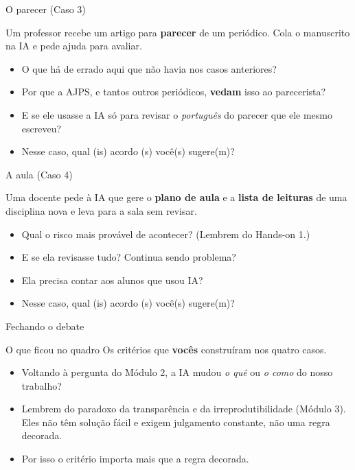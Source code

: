 \documentclass[11pt,aspectratio=169,t]{beamer}
\begin{document}
\begin{frame}{O parecer (Caso 3)}
  \begin{alertblock}{}
    \centering\large
    Um professor recebe um artigo para \textbf{parecer} de um periódico. Cola o manuscrito na IA e pede ajuda para avaliar.
  \end{alertblock}
  \vfill
  \begin{itemize}
    \item O que há de errado aqui que não havia nos casos anteriores?
    \item Por que a AJPS, e tantos outros periódicos, \textbf{vedam} isso ao parecerista?
    \item E se ele usasse a IA só para revisar o \textit{português} do parecer que ele mesmo escreveu?
         \item Nesse caso, qual (is) acordo (s) você(s) sugere(m)?
  \end{itemize}
\end{frame}
\begin{frame}{A aula (Caso 4)}
  \begin{alertblock}{}
    \centering\large
    Uma docente pede à IA que gere o \textbf{plano de aula} e a \textbf{lista de leituras} de uma disciplina nova e leva para a sala sem revisar.
  \end{alertblock}
  \vfill
  \begin{itemize}
    \item Qual o risco mais provável de acontecer? (Lembrem do Hands-on 1.)
    \item E se ela revisasse tudo? Continua sendo problema?
    \item Ela precisa contar aos alunos que usou IA?
         \item Nesse caso, qual (is) acordo (s) você(s) sugere(m)?
  \end{itemize}
\end{frame}

\begin{frame}{Fechando o debate}
  \begin{block}{O que ficou no quadro}
    \centering Os critérios que \textbf{vocês} construíram nos quatro casos.
  \end{block}
  \pause
  \vfill
  \begin{itemize}
    \item Voltando à pergunta do Módulo 2, a IA mudou \textit{o quê} ou \textit{o como} do nosso trabalho?
    \pause
    \item Lembrem do paradoxo da transparência e da irreprodutibilidade (Módulo 3). Eles não têm solução fácil e exigem julgamento constante, não uma regra decorada.
    \pause
    \item \alert{Por isso o critério importa mais que a regra decorada.}
  \end{itemize}
\end{frame}
\end{document}
